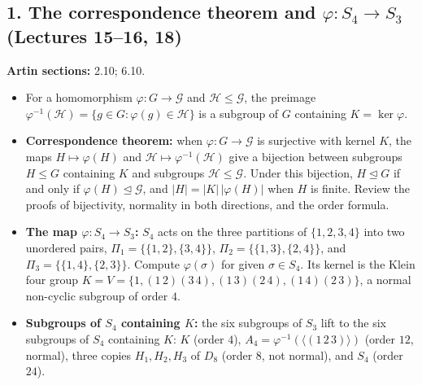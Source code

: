 \documentclass[11pt,reqno]{amsart}
\begin{document}
\subsection*{1. The correspondence theorem and \texorpdfstring{$\varphi:S_4\to S_3$}{the map from S4 to S3} (Lectures 15--16, 18)}
\noindent\textbf{Artin sections:} 2.10; 6.10.\par
\begin{itemize}
\item For a homomorphism $\varphi:G\to\mathcal G$ and $\mathcal H\leq\mathcal G$,
the preimage $\varphi^{-1}(\mathcal H)=\{g\in G:\varphi(g)\in\mathcal H\}$ is a
subgroup of $G$ containing $K=\ker\varphi$.
\item \textbf{Correspondence theorem:} when $\varphi:G\to\mathcal G$ is surjective
with kernel $K$, the maps $H\mapsto\varphi(H)$ and
$\mathcal H\mapsto\varphi^{-1}(\mathcal H)$ give a bijection between subgroups
$H\leq G$ containing $K$ and subgroups $\mathcal H\leq\mathcal G$.
Under this bijection, $H\trianglelefteq G$ if and only if
$\varphi(H)\trianglelefteq\mathcal G$, and $|H|=|K|\,|\varphi(H)|$ when $H$ is finite.
Review the proofs of bijectivity, normality in both directions, and the order formula.
\item \textbf{The map $\varphi:S_4\to S_3$:} $S_4$ acts on the three partitions of
$\{1,2,3,4\}$ into two unordered pairs,
$\Pi_1=\bigl\{\{1,2\},\{3,4\}\bigr\}$,
$\Pi_2=\bigl\{\{1,3\},\{2,4\}\bigr\}$, and
$\Pi_3=\bigl\{\{1,4\},\{2,3\}\bigr\}$.
Compute $\varphi(\sigma)$ for given $\sigma\in S_4$. Its kernel is the Klein four group
$K=V=\{1,(1\,2)(3\,4),(1\,3)(2\,4),(1\,4)(2\,3)\}$, a normal non-cyclic subgroup of order $4$.
\item \textbf{Subgroups of $S_4$ containing $K$:} the six subgroups of $S_3$ lift to
the six subgroups of $S_4$ containing $K$: $K$ (order $4$),
$A_4=\varphi^{-1}(\langle(1\,2\,3)\rangle)$ (order $12$, normal), three copies
$H_1,H_2,H_3$ of $D_8$ (order $8$, not normal), and $S_4$ (order $24$).
\end{itemize}
\end{document}
